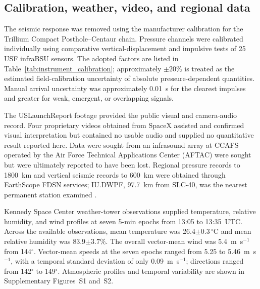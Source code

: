 \documentclass[]{seismica}
\begin{document}
\subsection{Calibration, weather, video, and regional data}

The seismic response was removed using the manufacturer calibration for the
Trillium Compact Posthole--Centaur chain. Pressure channels were calibrated
individually using comparative vertical-displacement and impulsive tests of 25
USF infraBSU sensors. The adopted factors are listed in
Table~\ref{tab:instrument_calibration}; approximately $\pm20\%$ is treated as
the estimated field-calibration uncertainty of absolute pressure-dependent
quantities. Manual arrival uncertainty was approximately 0.01~s for the
clearest impulses and greater for weak, emergent, or overlapping signals. 

The USLaunchReport footage provided the public visual and camera-audio record.
Four proprietary videos obtained from SpaceX assisted and confirmed visual
interpretation but contained no usable audio and supplied no quantitative
result reported here. Data were sought from an infrasound array at CCAFS
operated by the Air Force Technical Applications Center (AFTAC) were sought
but were ultimately reported to have been lost. Regional pressure records to 1800~km
and vertical seismic records to 600~km were obtained through EarthScope FDSN
services; IU.DWPF, 97.7~km from SLC-40, was the nearest permanent station
examined \citep{asl_gsn_iu_1988}. 

Kennedy Space Center weather-tower observations supplied temperature,
relative humidity, and wind profiles at seven 5-min epochs from 13:05 to
13:35~UTC. Across the available observations, mean temperature was
26.4$\pm0.3\,^{\circ}$C and mean relative humidity was
83.9$\pm3.7\%$. The overall vector-mean wind was 5.4~m~s$^{-1}$ from
144$^\circ$. Vector-mean speeds at the seven epochs ranged from 5.25 to
5.46~m~s$^{-1}$, with a temporal standard deviation of only
0.09~m~s$^{-1}$; directions ranged from 142$^\circ$ to 149$^\circ$.
Atmospheric profiles and temporal variability are shown in Supplementary
Figures~S1 and~S2.
\end{document}
